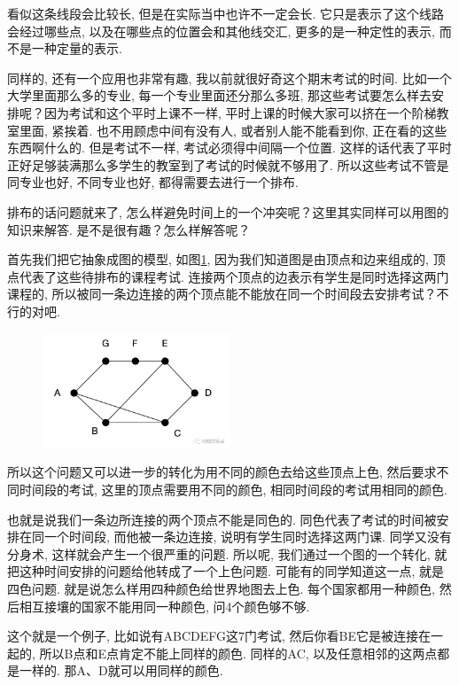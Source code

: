 看似这条线段会比较长, 但是在实际当中也许不一定会长. 它只是表示了这个线路会经过哪些点, 以及在哪些点的位置会和其他线交汇, 更多的是一种定性的表示, 而不是一种定量的表示. 

同样的, 还有一个应用也非常有趣, 我以前就很好奇这个期末考试的时间. 比如一个大学里面那么多的专业, 每一个专业里面还分那么多班, 那这些考试要怎么样去安排呢？因为考试和这个平时上课不一样, 平时上课的时候大家可以挤在一个阶梯教室里面, 紧挨着. 也不用顾虑中间有没有人, 或者别人能不能看到你, 正在看的这些东西啊什么的. 但是考试不一样, 考试必须得中间隔一个位置. 这样的话代表了平时正好足够装满那么多学生的教室到了考试的时候就不够用了. 所以这些考试不管是同专业也好, 不同专业也好, 都得需要去进行一个排布. 

排布的话问题就来了, 怎么样避免时间上的一个冲突呢？这里其实同样可以用图的知识来解答. 是不是很有趣？怎么样解答呢？

首先我们把它抽象成图的模型, 如图\ref{fig:img24_5}, 因为我们知道图是由顶点和边来组成的, 顶点代表了这些待排布的课程考试. 连接两个顶点的边表示有学生是同时选择这两门课程的, 所以被同一条边连接的两个顶点能不能放在同一个时间段去安排考试？不行的对吧. 

\begin{figure}[ht]
  \centering
  \includegraphics[width=0.5\textwidth]{asset/20231227144844.png}
  \caption{}
  \label{fig:img24_5}
\end{figure}

所以这个问题又可以进一步的转化为用不同的颜色去给这些顶点上色, 然后要求不同时间段的考试, 这里的顶点需要用不同的颜色, 相同时间段的考试用相同的颜色. 

也就是说我们一条边所连接的两个顶点不能是同色的. 同色代表了考试的时间被安排在同一个时间段, 而他被一条边连接, 说明有学生同时选择这两门课. 同学又没有分身术, 这样就会产生一个很严重的问题. 所以呢, 我们通过一个图的一个转化, 就把这种时间安排的问题给他转成了一个上色问题. 可能有的同学知道这一点, 就是四色问题. 就是说怎么样用四种颜色给世界地图去上色. 每个国家都用一种颜色, 然后相互接壤的国家不能用同一种颜色, 问4个颜色够不够. 

这个就是一个例子, 比如说有ABCDEFG这7门考试, 然后你看BE它是被连接在一起的, 所以B点和E点肯定不能上同样的颜色. 同样的AC, 以及任意相邻的这两点都是一样的. 那A、D就可以用同样的颜色. 

